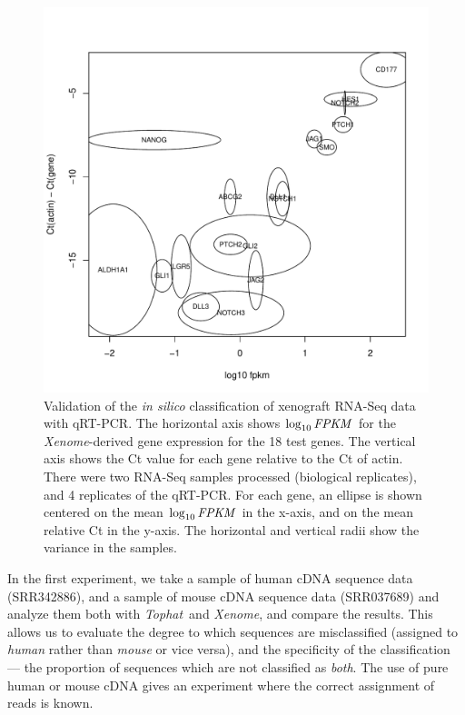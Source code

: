 \documentclass{bioinfo}
\newcommand{\Xenome}{\textit{Xenome}{}}
\newcommand{\Tophat}{\textit{Tophat}{}}
\newcommand{\fpkm}{\ensuremath{\hbox{\textit{FPKM}}}{}}
\begin{document}
\begin{figure}
\includegraphics[scale=0.5]{validation.pdf}
\caption{Validation of the \textit{in silico} classification of xenograft RNA-Seq
data with qRT-PCR. The horizontal axis shows $\log_{10} \fpkm$ for the
\Xenome-derived gene expression for the 18 test genes. The vertical
axis shows the Ct value for each gene relative to the Ct of actin. There were
two RNA-Seq samples processed (biological replicates),
and 4 replicates of the qRT-PCR. For each gene, an ellipse is shown centered
on the mean $\log_{10} \fpkm$ in the x-axis, and on the mean relative
Ct in the y-axis. The horizontal and vertical radii show the variance in the
samples.
}
\label{fig:validation}
\end{figure}

In the first experiment,
we take a sample of human cDNA sequence data (SRR342886), and a sample
of mouse cDNA sequence data (SRR037689) and analyze them both with
\Tophat\ and \Xenome, and compare the results.  This allows
us to evaluate the degree to which sequences are misclassified (assigned
to \textit{human} rather than \textit{mouse} or vice versa), and the
specificity of the classification --- the proportion of sequences which
are not classified as \textit{both}.
The use of pure human or mouse cDNA gives an experiment
where the correct assignment of reads is known.
\end{document}
